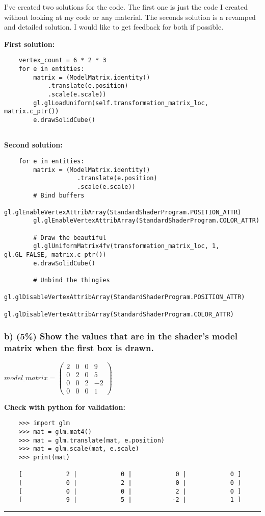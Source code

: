 I've created two solutions for the code. The first one is just the code I created without looking at my code or any material. The seconds solution is a revamped and detailed solution. I would like to get feedback for both if possible.

\textbf{First solution:}
\begin{verbatim}
    vertex_count = 6 * 2 * 3
    for e in entities:
        matrix = (ModelMatrix.identity()
            .translate(e.position)
            .scale(e.scale))
        gl.glLoadUniform(self.transformation_matrix_loc, matrix.c_ptr())
        e.drawSolidCube()
    
\end{verbatim}

\textbf{Second solution:}
\begin{verbatim}
    for e in entities:
        matrix = (ModelMatrix.identity()
                    .translate(e.position)
                    .scale(e.scale))
        # Bind buffers
        gl.glEnableVertexAttribArray(StandardShaderProgram.POSITION_ATTR)
        gl.glEnableVertexAttribArray(StandardShaderProgram.COLOR_ATTR)

        # Draw the beautiful
        gl.glUniformMatrix4fv(transformation_matrix_loc, 1, gl.GL_FALSE, matrix.c_ptr())
        e.drawSolidCube()
        
        # Unbind the thingies
        gl.glDisableVertexAttribArray(StandardShaderProgram.POSITION_ATTR)
        gl.glDisableVertexAttribArray(StandardShaderProgram.COLOR_ATTR)
\end{verbatim}

\subsubsection{b)  (5\%) Show the values that are in the shader’s model matrix when the first box is drawn.}

$ model\_matrix = \left(\begin{array}{cccc}2&0&0&9\\0&2&0&5\\0&0&2&-2\\0&0&0&1\end{array}\right) $

\textbf{Check with python for validation:}
\begin{verbatim}
    >>> import glm
    >>> mat = glm.mat4()
    >>> mat = glm.translate(mat, e.position)
    >>> mat = glm.scale(mat, e.scale)
    >>> print(mat)
    
    [            2 |            0 |            0 |            0 ]
    [            0 |            2 |            0 |            0 ]
    [            0 |            0 |            2 |            0 ]
    [            9 |            5 |           -2 |            1 ]
\end{verbatim}
\rule{\textwidth}{0.2mm}


